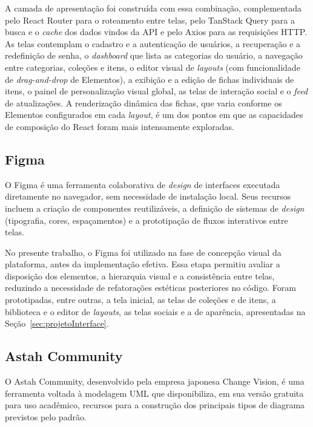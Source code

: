 A camada de apresentação foi construída com essa combinação, complementada pelo React Router para o roteamento entre telas, pelo TanStack Query para a busca e o \textit{cache} dos dados vindos da API e pelo Axios para as requisições HTTP. As telas contemplam o cadastro e a autenticação de usuários, a recuperação e a redefinição de senha, o \textit{dashboard} que lista as categorias do usuário, a navegação entre categorias, coleções e itens, o editor visual de \textit{layouts} (com funcionalidade de \textit{drag-and-drop} de Elementos), a exibição e a edição de fichas individuais de itens, o painel de personalização visual global, as telas de interação social e o \textit{feed} de atualizações. A renderização dinâmica das fichas, que varia conforme os Elementos configurados em cada \textit{layout}, é um dos pontos em que as capacidades de composição do React foram mais intensamente exploradas.

\subsection{Figma}

O Figma é uma ferramenta colaborativa de \textit{design} de interfaces executada diretamente no navegador, sem necessidade de instalação local. Seus recursos incluem a criação de componentes reutilizáveis, a definição de sistemas de \textit{design} (tipografia, cores, espaçamentos) e a prototipação de fluxos interativos entre telas.

No presente trabalho, o Figma foi utilizado na fase de concepção visual da plataforma, antes da implementação efetiva. Essa etapa permitiu avaliar a disposição dos elementos, a hierarquia visual e a consistência entre telas, reduzindo a necessidade de refatorações estéticas posteriores no código. Foram prototipadas, entre outras, a tela inicial, as telas de coleções e de itens, a biblioteca e o editor de \textit{layouts}, as telas sociais e a de aparência, apresentadas na Seção~\ref{sec:projetoInterface}.

\subsection{Astah Community}

O Astah Community, desenvolvido pela empresa japonesa Change Vision, é uma ferramenta voltada à modelagem UML que disponibiliza, em sua versão gratuita para uso acadêmico, recursos para a construção dos principais tipos de diagrama previstos pelo padrão.

